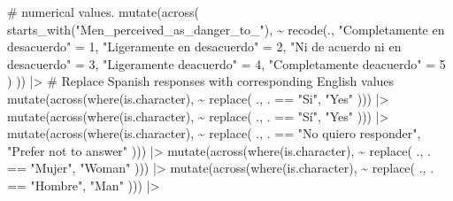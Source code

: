 \documentclass[
  bookmarksnumbered]{article}
\newenvironment{Shaded}{\begin{snugshade}}{\end{snugshade}}
\newcommand{\CommentTok}[1]{\textcolor[rgb]{0.50,0.62,0.50}{#1}}
\newcommand{\DecValTok}[1]{\textcolor[rgb]{0.86,0.86,0.80}{#1}}
\newcommand{\FunctionTok}[1]{\textcolor[rgb]{0.94,0.94,0.56}{#1}}
\newcommand{\NormalTok}[1]{\textcolor[rgb]{0.80,0.80,0.80}{#1}}
\newcommand{\OtherTok}[1]{\textcolor[rgb]{0.94,0.94,0.56}{#1}}
\newcommand{\SpecialCharTok}[1]{\textcolor[rgb]{0.86,0.64,0.64}{#1}}
\newcommand{\StringTok}[1]{\textcolor[rgb]{0.80,0.58,0.58}{#1}}
\begin{document}
\begin{Shaded}
\begin{Highlighting}[]
  \CommentTok{\# numerical values.}
  \FunctionTok{mutate}\NormalTok{(}\FunctionTok{across}\NormalTok{(}
    \FunctionTok{starts\_with}\NormalTok{(}\StringTok{"Men\_perceived\_as\_danger\_to\_"}\NormalTok{),}
    \SpecialCharTok{\textasciitilde{}} \FunctionTok{recode}\NormalTok{(.,}
             \StringTok{"Completamente en desacuerdo"} \OtherTok{=} \DecValTok{1}\NormalTok{,}
             \StringTok{"Ligeramente en desacuerdo"} \OtherTok{=} \DecValTok{2}\NormalTok{,}
             \StringTok{"Ni de acuerdo ni en desacuerdo"} \OtherTok{=} \DecValTok{3}\NormalTok{,}
             \StringTok{"Ligeramente deacuerdo"} \OtherTok{=} \DecValTok{4}\NormalTok{,}
             \StringTok{"Completamente deacuerdo"} \OtherTok{=} \DecValTok{5}
\NormalTok{    )}
\NormalTok{  )) }\SpecialCharTok{|\textgreater{}}
  \CommentTok{\# Replace Spanish responses with corresponding English values}
  \FunctionTok{mutate}\NormalTok{(}\FunctionTok{across}\NormalTok{(}\FunctionTok{where}\NormalTok{(is.character), }\SpecialCharTok{\textasciitilde{}} \FunctionTok{replace}\NormalTok{(}
\NormalTok{    ., . }\SpecialCharTok{==}
      \StringTok{"Si"}\NormalTok{,}
    \StringTok{"Yes"}
\NormalTok{  ))) }\SpecialCharTok{|\textgreater{}}
  \FunctionTok{mutate}\NormalTok{(}\FunctionTok{across}\NormalTok{(}\FunctionTok{where}\NormalTok{(is.character), }\SpecialCharTok{\textasciitilde{}} \FunctionTok{replace}\NormalTok{(}
\NormalTok{    ., . }\SpecialCharTok{==}
      \StringTok{"Sí"}\NormalTok{,}
    \StringTok{"Yes"}
\NormalTok{  ))) }\SpecialCharTok{|\textgreater{}}
  \FunctionTok{mutate}\NormalTok{(}\FunctionTok{across}\NormalTok{(}\FunctionTok{where}\NormalTok{(is.character), }\SpecialCharTok{\textasciitilde{}} \FunctionTok{replace}\NormalTok{(}
\NormalTok{    ., . }\SpecialCharTok{==}
      \StringTok{"No quiero responder"}\NormalTok{,}
    \StringTok{"Prefer not to answer"}
\NormalTok{  ))) }\SpecialCharTok{|\textgreater{}}
  \FunctionTok{mutate}\NormalTok{(}\FunctionTok{across}\NormalTok{(}\FunctionTok{where}\NormalTok{(is.character), }\SpecialCharTok{\textasciitilde{}} \FunctionTok{replace}\NormalTok{(}
\NormalTok{    ., . }\SpecialCharTok{==}
      \StringTok{"Mujer"}\NormalTok{,}
    \StringTok{"Woman"}
\NormalTok{  ))) }\SpecialCharTok{|\textgreater{}}
  \FunctionTok{mutate}\NormalTok{(}\FunctionTok{across}\NormalTok{(}\FunctionTok{where}\NormalTok{(is.character), }\SpecialCharTok{\textasciitilde{}} \FunctionTok{replace}\NormalTok{(}
\NormalTok{    ., . }\SpecialCharTok{==}
      \StringTok{"Hombre"}\NormalTok{,}
    \StringTok{"Man"}
\NormalTok{  ))) }\SpecialCharTok{|\textgreater{}}

\end{Highlighting}
\end{Shaded}
\end{document}
